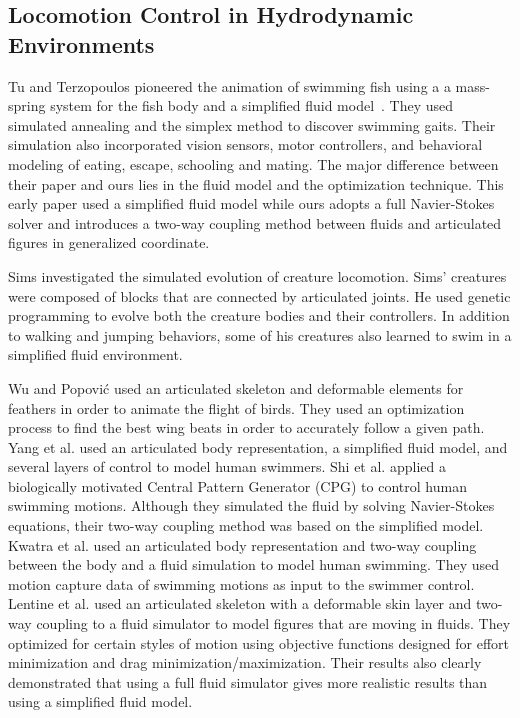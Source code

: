 \subsection{Locomotion Control in Hydrodynamic Environments}

Tu and Terzopoulos pioneered the animation of swimming fish using a a
mass-spring system for the fish body and a simplified fluid
model~\cite{tu1994artificial,terzopoulos1994artificial,Grzeszczuk95automatedlearning}. They used simulated annealing and the simplex method to discover swimming gaits. Their simulation also incorporated vision sensors, motor controllers, and behavioral modeling
of eating, escape, schooling and mating.  The
major difference between their paper and ours lies in the fluid model and the optimization technique. This early paper used a
simplified fluid model while ours adopts a full Navier-Stokes solver and introduces a two-way coupling method between
fluids and articulated figures in generalized coordinate.

Sims \cite{sims1994creatures} investigated the simulated evolution of
creature locomotion.  Sims' creatures were composed
of blocks that are connected by articulated joints. He used genetic
programming to evolve both the creature bodies and their controllers.  In
addition to walking and jumping behaviors, some of his creatures also
learned to swim in a simplified fluid environment.

Wu and Popovi\'{c} \cite{wu2003realistic} used an articulated skeleton and deformable elements for
feathers in order to animate the flight of birds.
They used an optimization process to find the best wing beats in order to
accurately follow a given path.  Yang et al. \cite{yang2004layered} used an articulated body
representation, a simplified fluid model, and several layers of control to
model human swimmers. Shi et al. \cite{} applied a biologically motivated Central Pattern Generator (CPG) to control human swimming motions. Although they simulated the fluid by solving Navier-Stokes equations, their two-way coupling method was based on the simplified model. Kwatra et al. \cite{kwatra2009fluid} used an
articulated body representation and two-way coupling between the body and a
fluid simulation to model human swimming.  They used
motion capture data of swimming motions as input to the swimmer control.
Lentine et al. \cite{lentine2010creature} used an articulated skeleton with a deformable skin layer and
two-way coupling to a fluid simulator to model figures that are moving in
fluids.  They optimized for certain styles of
motion using objective functions designed for effort minimization and drag
minimization/maximization.  Their results also clearly demonstrated that
using a full fluid simulator gives more realistic results than using a
simplified fluid model.

